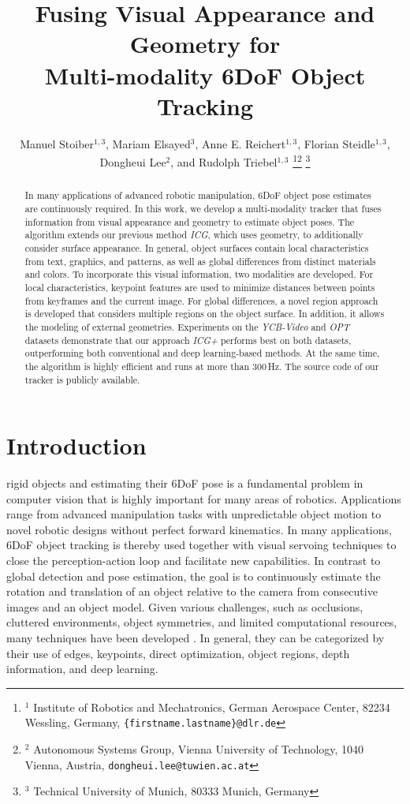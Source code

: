 \documentclass[letterpaper, 10 pt, conference]{ieeeconf}
\title{\LARGE \bf
Fusing Visual Appearance and Geometry for\\ Multi-modality 6DoF Object Tracking
}
\author{Manuel Stoiber$^{1, 3}$, Mariam Elsayed$^{3}$, Anne E. Reichert$^{1, 3}$, Florian Steidle$^{1, 3}$,\\ Dongheui Lee$^{2}$, and Rudolph Triebel$^{1, 3}$
	\thanks{$^{1}$ Institute of Robotics and Mechatronics, German Aerospace Center, 82234 Wessling, Germany, {\tt\small \{firstname.lastname\}@dlr.de}}\thanks{$^{2}$ Autonomous Systems Group, Vienna University of Technology, 1040 Vienna, Austria, {\tt\small dongheui.lee@tuwien.ac.at}}
	\thanks{$^{3}$ Technical University of Munich, 80333 Munich, Germany}}
\begin{document}
\maketitle
\thispagestyle{empty}
\pagestyle{empty}



\begin{abstract}
	In many applications of advanced robotic manipulation, \ac{6DoF} object pose estimates are continuously required.
	In this work, we develop a multi-modality tracker that fuses information from visual appearance and geometry to estimate object poses.
	The algorithm extends our previous method \textit{ICG}, which uses geometry, to additionally consider surface appearance.
	In general, object surfaces contain local characteristics from text, graphics, and patterns, as well as global differences from distinct materials and colors.
	To incorporate this visual information, two modalities are developed.
	For local characteristics, keypoint features are used to minimize distances between points from keyframes and the current image.
	For global differences, a novel region approach is developed that considers multiple regions on the object surface.
	In addition, it allows the modeling of external geometries.
	Experiments on the \textit{YCB-Video} and \textit{OPT} datasets demonstrate that our approach \textit{ICG+} performs best on both datasets, outperforming both conventional and deep learning-based methods.
	At the same time, the algorithm is highly efficient and runs at more than 300\,Hz.
	The source code of our tracker is publicly available.
\end{abstract}
 


\section{Introduction}\label{sec:in}
 rigid objects and estimating their \ac{6DoF} pose is a fundamental problem in computer vision that is highly important for many areas of
robotics.
Applications range from advanced manipulation tasks with unpredictable object motion to novel robotic designs without perfect forward kinematics.
In many applications, \ac{6DoF} object tracking is thereby used together with visual servoing techniques to close the perception-action loop and facilitate new capabilities.
In contrast to global detection and pose estimation, the goal is to continuously estimate the rotation and translation of an object relative to the camera from consecutive images and an object model.
Given various challenges, such as occlusions, cluttered environments, object symmetries, and limited computational resources, many techniques have been developed \cite{Lepetit2005, Yilmaz2006}.
In general, they can be categorized by their use of edges, keypoints,
direct optimization, object regions, depth information, and deep learning.
\end{document}
